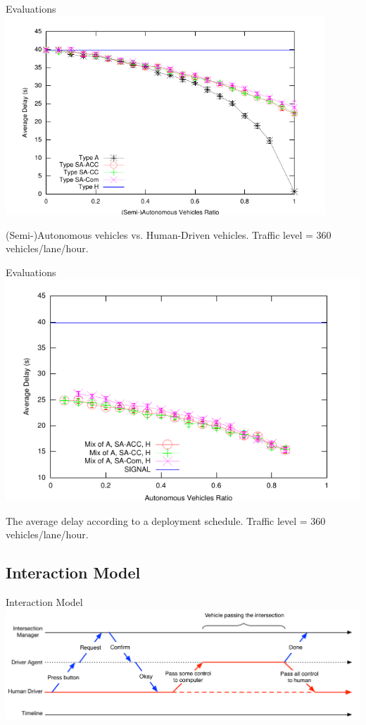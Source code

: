 \documentclass{beamer}
\begin{document}
\begin{frame}{Evaluations}
\includegraphics[width=0.9\textwidth]{figures/figure_1.pdf}

(Semi-)Autonomous vehicles vs. Human-Driven vehicles. Traffic
level = 360 vehicles/lane/hour.
\end{frame}

\begin{frame}{Evaluations}
\includegraphics[width=0.9\columnwidth]{figures/figure_3.pdf}

The average delay according to a deployment schedule. Traffic level =
360 vehicles/lane/hour.
\end{frame}

\subsection{Interaction Model}

\begin{frame}{Interaction Model}
\includegraphics[width=\textwidth]{figures/interaction}
\end{frame}
\end{document}
